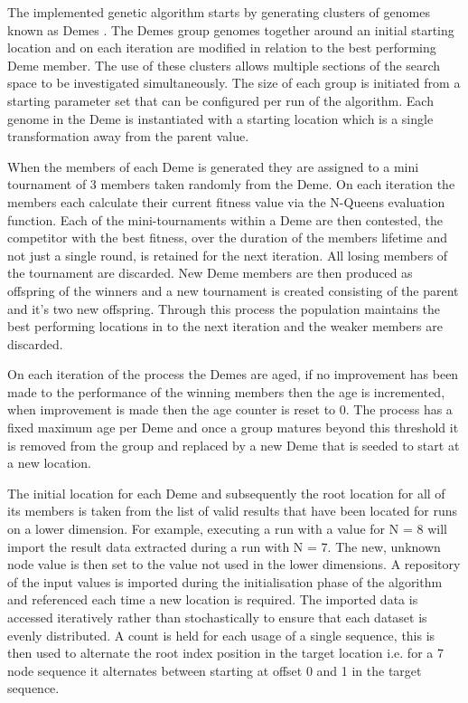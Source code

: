 \documentclass[conference]{IEEEtran}
\begin{document}
The implemented genetic algorithm starts by generating clusters of genomes known as Demes \cite{Demes}. The Demes group genomes together around an initial starting location and on each iteration are modified in relation to the best performing Deme member. The use of these clusters allows multiple sections of the search space to be investigated simultaneously. The size of each group is initiated from a starting parameter set that can be configured per run of the algorithm. Each genome in the Deme is instantiated with a starting location which is a single transformation away from the parent value. 

When the members of each Deme is generated they are assigned to a mini tournament of 3 members taken randomly from the Deme. On each iteration the members each calculate their current fitness value via the N-Queens evaluation function. Each of the mini-tournaments within a Deme are then contested, the competitor with the best fitness, over the duration of the members lifetime and not just a single round, is retained for the next iteration. All losing members of the tournament are discarded. New Deme members are then produced as offspring of the winners and a new tournament is created consisting of the parent and it's two new offspring. Through this process the population maintains the best performing locations in to the next iteration and the weaker members are discarded.

On each iteration of the process the Demes are aged, if no improvement has been made to the performance of the winning members then the age is incremented, when improvement is made then the age counter is reset to 0. The process has a fixed maximum age per Deme and once a group matures beyond this threshold it is removed from the group and replaced by a new Deme that is seeded to start at a new location.

The initial location for each Deme and subsequently the root location for all of its members is taken from the list of valid results that have been located for runs on a lower dimension. For example, executing a run with a value for N = 8 will import the result data extracted during a run with N = 7. The new, unknown node value is then set to the value not used in the lower dimensions. A repository of the input values is imported during the initialisation phase of the algorithm and referenced each time a new location is required. The imported data is accessed iteratively rather than stochastically to ensure that each dataset is evenly distributed. A count is held for each usage of a single sequence, this is then used to alternate the root index position in the target location i.e. for a 7 node sequence it alternates between starting at offset 0 and 1 in the target sequence.
\end{document}
